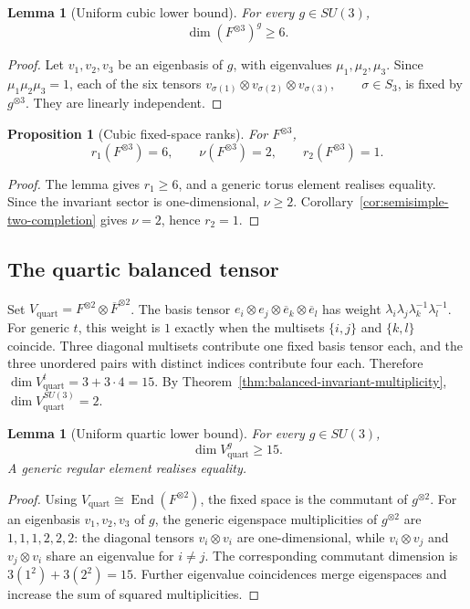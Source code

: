 \documentclass[11pt]{article}
\theoremstyle{plain}
\newtheorem{proposition}[theorem]{Proposition}
\newtheorem{lemma}[theorem]{Lemma}
\theoremstyle{definition}
\begin{document}
\begin{lemma}[Uniform cubic lower bound]
\label{lem:cubic-single-lower-bound}
For every \(g\in SU(3)\),
\[
\dim(F^{\otimes3})^g\geq6.
\]
\end{lemma}

\begin{proof}
Let \(v_1,v_2,v_3\) be an eigenbasis of \(g\), with eigenvalues \(\mu_1,\mu_2,\mu_3\). Since \(\mu_1\mu_2\mu_3=1\), each of the six tensors
\(v_{\sigma(1)}\otimes v_{\sigma(2)}\otimes v_{\sigma(3)}, \qquad \sigma\in S_3\),
is fixed by \(g^{\otimes3}\). They are linearly independent.
\end{proof}

\begin{proposition}[Cubic fixed-space ranks]
\label{prop:SU3-cubic-nu}
For \(F^{\otimes3}\),
\[
r_1(F^{\otimes3})=6,
\qquad
\nu(F^{\otimes3})=2,
\qquad
r_2(F^{\otimes3})=1.
\]
\end{proposition}

\begin{proof}
The lemma gives \(r_1\geq6\), and a generic torus element realises equality. Since the invariant sector is one-dimensional, \(\nu\geq2\). Corollary~\ref{cor:semisimple-two-completion} gives \(\nu=2\), hence \(r_2=1\).
\end{proof}

\subsection{The quartic balanced tensor}

Set
\(V_{\mathrm{quart}} = F^{\otimes2}\otimes\overline F^{\otimes2}\).
The basis tensor \(e_i\otimes e_j\otimes\overline e_k\otimes\overline e_l\) has weight
\(\lambda_i\lambda_j\lambda_k^{-1}\lambda_l^{-1}\).
For generic \(t\), this weight is \(1\) exactly when the multisets \(\{i,j\}\) and \(\{k,l\}\) coincide. Three diagonal multisets contribute one fixed basis tensor each, and the three unordered pairs with distinct indices contribute four each. Therefore
\(\dim V_{\mathrm{quart}}^t = 3+3\cdot4 = 15\).
By Theorem~\ref{thm:balanced-invariant-multiplicity},
\(\dim V_{\mathrm{quart}}^{SU(3)}=2\).

\begin{lemma}[Uniform quartic lower bound]
\label{lem:quartic-lower-bound}
For every \(g\in SU(3)\),
\[
\dim V_{\mathrm{quart}}^g\geq15.
\]
A generic regular element realises equality.
\end{lemma}

\begin{proof}
Using
\(V_{\mathrm{quart}} \cong \operatorname{End}(F^{\otimes2})\),
the fixed space is the commutant of \(g^{\otimes2}\). For an eigenbasis \(v_1,v_2,v_3\) of \(g\), the generic eigenspace multiplicities of \(g^{\otimes2}\) are
\(1,1,1,2,2,2\):
the diagonal tensors \(v_i\otimes v_i\) are one-dimensional, while \(v_i\otimes v_j\) and \(v_j\otimes v_i\) share an eigenvalue for \(i\neq j\). The corresponding commutant dimension is
\(3(1^2)+3(2^2)=15\).
Further eigenvalue coincidences merge eigenspaces and increase the sum of squared multiplicities.
\end{proof}
\end{document}
